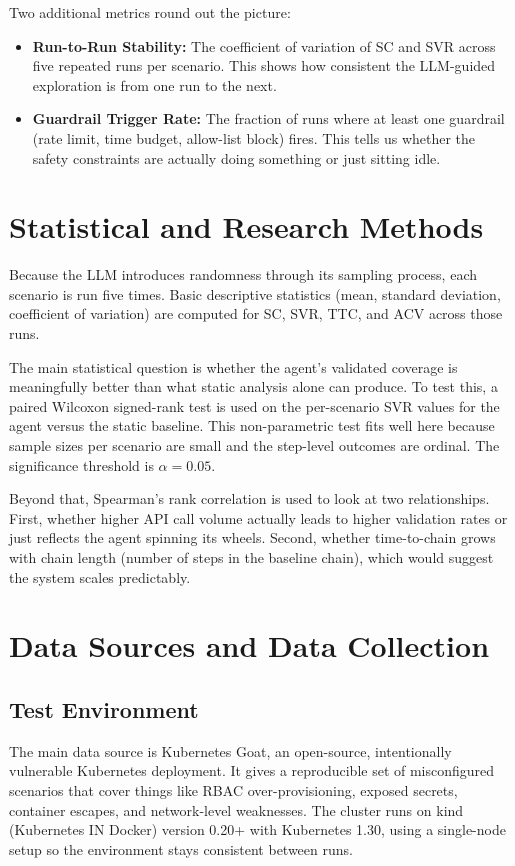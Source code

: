 \documentclass[conference]{IEEEtran}
\begin{document}
Two additional metrics round out the picture:
\begin{itemize}
    \item \textbf{Run-to-Run Stability:} The coefficient of variation of SC and SVR across five repeated runs per scenario. This shows how consistent the LLM-guided exploration is from one run to the next.
    \item \textbf{Guardrail Trigger Rate:} The fraction of runs where at least one guardrail (rate limit, time budget, allow-list block) fires. This tells us whether the safety constraints are actually doing something or just sitting idle.
\end{itemize}

\section{Statistical and Research Methods}

Because the LLM introduces randomness through its sampling process, each scenario is run five times. Basic descriptive statistics (mean, standard deviation, coefficient of variation) are computed for SC, SVR, TTC, and ACV across those runs.

The main statistical question is whether the agent's validated coverage is meaningfully better than what static analysis alone can produce. To test this, a paired Wilcoxon signed-rank test is used on the per-scenario SVR values for the agent versus the static baseline. This non-parametric test fits well here because sample sizes per scenario are small and the step-level outcomes are ordinal. The significance threshold is $\alpha = 0.05$.

Beyond that, Spearman's rank correlation is used to look at two relationships. First, whether higher API call volume actually leads to higher validation rates or just reflects the agent spinning its wheels. Second, whether time-to-chain grows with chain length (number of steps in the baseline chain), which would suggest the system scales predictably.

\section{Data Sources and Data Collection}

\subsection{Test Environment}
The main data source is Kubernetes Goat, an open-source, intentionally vulnerable Kubernetes deployment. It gives a reproducible set of misconfigured scenarios that cover things like RBAC over-provisioning, exposed secrets, container escapes, and network-level weaknesses. The cluster runs on kind (Kubernetes IN Docker) version 0.20+ with Kubernetes 1.30, using a single-node setup so the environment stays consistent between runs.
\end{document}
